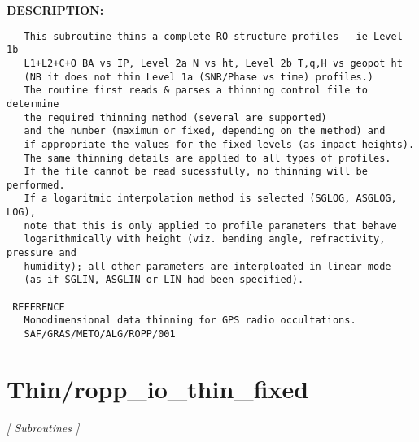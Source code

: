 \textbf{DESCRIPTION:}\hspace{0.08in}\begin{Verbatim}
   This subroutine thins a complete RO structure profiles - ie Level 1b
   L1+L2+C+O BA vs IP, Level 2a N vs ht, Level 2b T,q,H vs geopot ht
   (NB it does not thin Level 1a (SNR/Phase vs time) profiles.)
   The routine first reads & parses a thinning control file to determine
   the required thinning method (several are supported)
   and the number (maximum or fixed, depending on the method) and
   if appropriate the values for the fixed levels (as impact heights).
   The same thinning details are applied to all types of profiles.
   If the file cannot be read sucessfully, no thinning will be performed.
   If a logaritmic interpolation method is selected (SGLOG, ASGLOG, LOG),
   note that this is only applied to profile parameters that behave
   logarithmically with height (viz. bending angle, refractivity, pressure and
   humidity); all other parameters are interploated in linear mode
   (as if SGLIN, ASGLIN or LIN had been specified).

 REFERENCE
   Monodimensional data thinning for GPS radio occultations.
   SAF/GRAS/METO/ALG/ROPP/001
\end{Verbatim}
\section{Thin/ropp\_io\_thin\_fixed}
\textsl{[ Subroutines ]}

